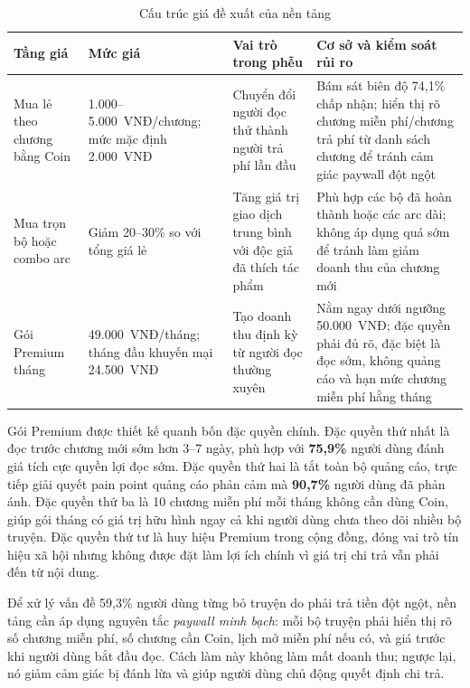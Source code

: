 \begin{table}[htbp]
\centering
\caption{Cấu trúc giá đề xuất của nền tảng}
\label{tab:pricing-tier}
\renewcommand{\arraystretch}{1.3}
\small
\begin{tabular}{|L{2.8cm}|L{3.2cm}|L{3.6cm}|L{4.4cm}|}
\hline
\textbf{Tầng giá} & \textbf{Mức giá} & \textbf{Vai trò trong phễu} & \textbf{Cơ sở và kiểm soát rủi ro} \\
\hline
Mua lẻ theo chương bằng Coin
& 1.000--5.000~VNĐ/\allowbreak chương; mức mặc định 2.000~VNĐ
& Chuyển đổi người đọc thử thành người trả phí lần đầu
& Bám sát biên độ 74{,}1\% chấp nhận; hiển thị rõ chương miễn phí/chương trả phí từ danh sách chương để tránh cảm giác paywall đột ngột \\
\hline
Mua trọn bộ hoặc combo arc
& Giảm 20--30\% so với tổng giá lẻ
& Tăng giá trị giao dịch trung bình với độc giả đã thích tác phẩm
& Phù hợp các bộ đã hoàn thành hoặc các arc dài; không áp dụng quá sớm để tránh làm giảm doanh thu của chương mới \\
\hline
Gói Premium tháng
& 49.000~VNĐ/\allowbreak tháng; tháng đầu khuyến mại 24.500~VNĐ
& Tạo doanh thu định kỳ từ người đọc thường xuyên
& Nằm ngay dưới ngưỡng 50.000~VNĐ; đặc quyền phải đủ rõ, đặc biệt là đọc sớm, không quảng cáo và hạn mức chương miễn phí hằng tháng \\
\hline
\end{tabular}
\end{table}

Gói Premium được thiết kế quanh bốn đặc quyền chính. Đặc quyền thứ nhất là đọc trước chương mới sớm hơn 3--7 ngày, phù hợp với \textbf{75{,}9\%} người dùng đánh giá tích cực quyền lợi đọc sớm. Đặc quyền thứ hai là tắt toàn bộ quảng cáo, trực tiếp giải quyết pain point quảng cáo phản cảm mà \textbf{90{,}7\%} người dùng đã phản ánh. Đặc quyền thứ ba là 10 chương miễn phí mỗi tháng không cần dùng Coin, giúp gói tháng có giá trị hữu hình ngay cả khi người dùng chưa theo dõi nhiều bộ truyện. Đặc quyền thứ tư là huy hiệu Premium trong cộng đồng, đóng vai trò tín hiệu xã hội nhưng không được đặt làm lợi ích chính vì giá trị chi trả vẫn phải đến từ nội dung.

Để xử lý vấn đề 59{,}3\% người dùng từng bỏ truyện do phải trả tiền đột ngột, nền tảng cần áp dụng nguyên tắc \textit{paywall minh bạch}: mỗi bộ truyện phải hiển thị rõ số chương miễn phí, số chương cần Coin, lịch mở miễn phí nếu có, và giá trước khi người dùng bắt đầu đọc. Cách làm này không làm mất doanh thu; ngược lại, nó giảm cảm giác bị đánh lừa và giúp người dùng chủ động quyết định chi trả.

